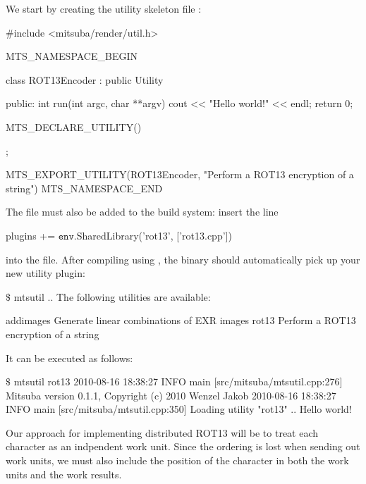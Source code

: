 We start by creating the utility skeleton file :
\begin{cpp}
#include <mitsuba/render/util.h>

MTS_NAMESPACE_BEGIN

class ROT13Encoder : public Utility {
public:
    int run(int argc, char **argv) {
        cout << "Hello world!" << endl;
        return 0;
    }

    MTS_DECLARE_UTILITY()
};

MTS_EXPORT_UTILITY(ROT13Encoder, "Perform a ROT13 encryption of a string")
MTS_NAMESPACE_END
\end{cpp}
The file must also be added to the build system: insert the line
\begin{shell}
plugins += $\texttt{env}$.SharedLibrary('rot13', ['rot13.cpp'])
\end{shell}
into the  file. After compiling
using , the  binary should automatically pick up your new utility plugin:
\begin{shell}
$\texttt{\$}$ mtsutil
..
The following utilities are available:

    addimages             Generate linear combinations of EXR images
    rot13                 Perform a ROT13 encryption of a string
\end{shell}
It can be executed as follows:
\begin{shell}
$\texttt{\$}$ mtsutil rot13
2010-08-16 18:38:27 INFO  main [src/mitsuba/mtsutil.cpp:276] Mitsuba version 0.1.1, Copyright (c) 2010 Wenzel Jakob
2010-08-16 18:38:27 INFO  main [src/mitsuba/mtsutil.cpp:350] Loading utility "rot13" ..
Hello world!
\end{shell}

Our approach for implementing distributed ROT13 will be to treat each character as an
indpendent work unit. Since the ordering is lost when sending out work units, we must
also include the position of the character in both the work units and the work results.


